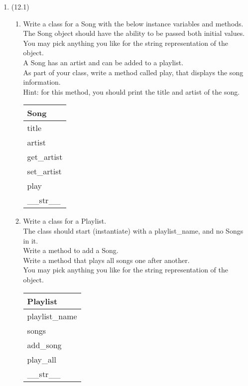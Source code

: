 \documentclass{article}
\begin{document}
\begin{enumerate}
\item (12.1)
	\begin{enumerate}
		\item
			Write a class for a Song with the below instance variables and methods.\\ 
			The Song object should have the ability to be passed both initial values.\\  
			You may pick anything you like for the string representation of the object.\\
			A Song has an artist and can be added to a playlist.\\  
			As part of your class, write a method called play, that displays the song information.\\
			Hint: for this method, you should print the title and artist of the song.
			\begin{flushright}
			\begin{tabular}{|l|}
				\hline
				Song\\ \hline
				title \\	artist\\	 \hline
				get\_artist \\ set\_artist \\ play \\ \_\_str\_\_ \\ \hline
			\end{tabular}
			\end{flushright}

		\item
			Write a class for a Playlist. \\
			The class should start (instantiate) with a playlist\_name, and no Songs in it. \\ 
			Write a method to add a Song.\\
			Write a method that plays all songs one after another.\\
			You may pick anything you like for the string representation of the object.
	
			\begin{flushright}
			\begin{tabular}{|l|}
				\hline
				Playlist\\ \hline  	%
				playlist\_name \\ songs\\ \hline		%
				add\_song \\ play\_all \\ \_\_str\_\_ \\ \hline		%
			\end{tabular}
			\end{flushright}


\end{enumerate}
\end{enumerate}
\end{document}
